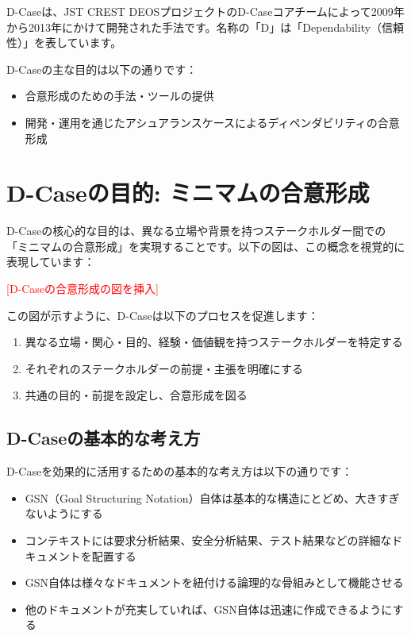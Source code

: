 D-Caseは、JST CREST DEOSプロジェクトのD-Caseコアチームによって2009年から2013年にかけて開発された手法です。名称の「D」は「Dependability（信頼性）」を表しています。

D-Caseの主な目的は以下の通りです：

\begin{itemize}
    \item 合意形成のための手法・ツールの提供
    \item 開発・運用を通じたアシュアランスケースによるディペンダビリティの合意形成
\end{itemize}

\section{D-Caseの目的: ミニマムの合意形成}

D-Caseの核心的な目的は、異なる立場や背景を持つステークホルダー間での「ミニマムの合意形成」を実現することです。以下の図は、この概念を視覚的に表現しています：

\textcolor{red}{[D-Caseの合意形成の図を挿入]}

この図が示すように、D-Caseは以下のプロセスを促進します：

\begin{enumerate}
    \item 異なる立場・関心・目的、経験・価値観を持つステークホルダーを特定する
    \item それぞれのステークホルダーの前提・主張を明確にする
    \item 共通の目的・前提を設定し、合意形成を図る
\end{enumerate}

\subsection{D-Caseの基本的な考え方}

D-Caseを効果的に活用するための基本的な考え方は以下の通りです：

\begin{itemize}
    \item GSN（Goal Structuring Notation）自体は基本的な構造にとどめ、大きすぎないようにする
    \item コンテキストには要求分析結果、安全分析結果、テスト結果などの詳細なドキュメントを配置する
    \item GSN自体は様々なドキュメントを紐付ける論理的な骨組みとして機能させる
    \item 他のドキュメントが充実していれば、GSN自体は迅速に作成できるようにする
\end{itemize}

